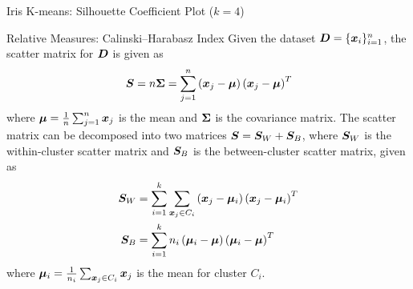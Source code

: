 \begin{frame}[fragile]{Iris K-means: Silhouette Coeff\/{i}cient Plot
  ($k=4$)}
\begin{figure}
\captionsetup[subfloat]{captionskip=0.5in}
\centerline{ } 
\end{figure}
\end{frame}



\begin{frame}{Relative Measures: Calinski--Harabasz Index}
  Given the dataset ${\boldsymbol D} =\{{\boldsymbol x}_i\}_{i=1}^n$,
the scatter matrix for ${\boldsymbol D}$ is given as
\begin{align*}
  {\boldsymbol S} = n{\bm \Sigma} = \sum_{j=1}^n \left({\boldsymbol x}_{j} - {\bm \mu}\right)
  \left({\boldsymbol x}_{j} - {\bm \mu}\right)^T
\end{align*}
where ${\bm \mu} = \tfrac{1}{n} \sum_{j=1}^n {\boldsymbol x}_{j} $ is the mean and ${\bm \Sigma}$
is the covariance matrix.  The scatter matrix can
be decomposed into two matrices ${\boldsymbol S} = {\boldsymbol S}_W + {\boldsymbol S}_B$,
where ${\boldsymbol S}_W$ is the within-cluster scatter
matrix and ${\boldsymbol S}_B$ is the between-cluster scatter matrix, given
as
\begin{align*}
  {\boldsymbol S}_W & = \sum_{i=1}^k \sum_{{\boldsymbol x}_{j} \in C_i}
  \left({\boldsymbol x}_{j} - {\bm \mu}_i\right) \left({\boldsymbol x}_{j} - {\bm \mu}_i\right)^T\\
  {\boldsymbol S}_B & = \sum_{i=1}^k n_i
  \left({\bm \mu}_i - {\bm \mu}\right) \left({\bm \mu}_i - {\bm \mu}\right)^T
\end{align*}
where ${\bm \mu}_i = \tfrac{1}{n_i} \sum_{{\boldsymbol x}_{j} \in C_i} {\boldsymbol x}_{j}$ is
the mean for cluster $C_i$.
\end{frame}



